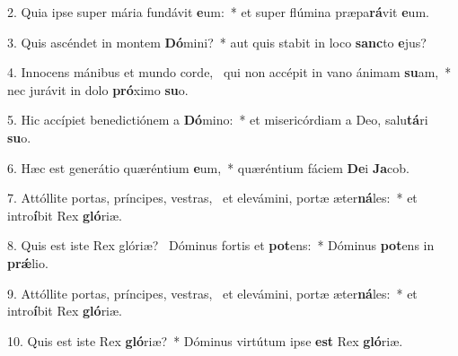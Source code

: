 2. Quia ipse super mária fundávit \textbf{e}um:~*  et super flúmina præpa\textbf{rá}vit \textbf{e}um.\

3. Quis ascéndet in montem \textbf{Dó}mini?~*  aut quis stabit in loco \textbf{sanc}to \textbf{e}jus?\

4. Innocens mánibus et mundo corde, \dag\  qui non accépit in vano ánimam \textbf{su}am,~*  nec jurávit in dolo \textbf{pró}ximo \textbf{su}o.\

5. Hic accípiet benedictiónem a \textbf{Dó}mino:~*  et misericórdiam a Deo, salu\textbf{tá}ri \textbf{su}o.\

6. Hæc est generátio quæréntium \textbf{e}um,~*  quæréntium fáciem \textbf{De}i \textbf{Ja}cob.\

7. Attóllite portas, príncipes, vestras, \dag\  et elevámini, portæ æter\textbf{ná}les:~*  et intro\textbf{í}bit Rex \textbf{gló}riæ.\

8. Quis est iste Rex glóriæ? \dag\  Dóminus fortis et \textbf{pot}ens:~*  Dóminus \textbf{pot}ens in \textbf{prǽ}lio.\

9. Attóllite portas, príncipes, vestras, \dag\  et elevámini, portæ æter\textbf{ná}les:~*  et intro\textbf{í}bit Rex \textbf{gló}riæ.\

10. Quis est iste Rex \textbf{gló}riæ?~*  Dóminus virtútum ipse \textbf{est} Rex \textbf{gló}riæ.\

